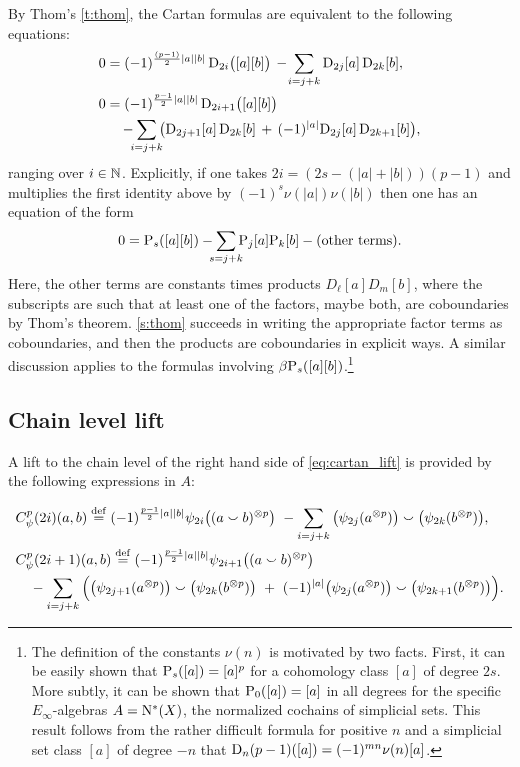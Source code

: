 By Thom's \cref{t:thom}, the Cartan formulas are equivalent to the following equations:
\begin{equation}\label{eq:cartan_lift}
	\begin{split}
		0 &= (-1)^{\frac{(p-1)}{2}\bars{a}\bars{b}} \, \rD_{2i}\big([a][b]\big) \,-\!
		\sum_{i=j+k} \rD_{2j}[a] \, \rD_{2k}[b], \\
		0 &= (-1)^{\frac{p-1}{2}\bars{a}\bars{b}} \, \rD_{2i+1}\big([a][b]\big) \\ & \quad
		-\sum_{\mathclap{i=j+k}} \big(\rD_{2j+1}[a] \, \rD_{2k}[b] \, +\, (-1)^{\bars{a}}\rD_{2j}[a] \, \rD_{2k+1}[b]\big),
	\end{split}
\end{equation}
ranging over $i \in \mathbb{N}$.
Explicitly, if one takes $2i = (2s-(|a|+|b|))(p-1)$ and multiplies the first identity above by $(-1)^s \nu(|a|)\nu(|b|)$ then one has an equation of the form
\[
0 = \rP_s([a][b]) - \sum_{\mathclap{s=j+k}} \rP_j[a] \rP_k[b] - \text{(other terms)}.
\]
Here, the other terms are constants times products $D_\ell[a] D_m[b]$, where the subscripts are such that at least one of the factors, maybe both, are coboundaries by Thom’s theorem.
\cref{s:thom} succeeds in writing the appropriate factor terms as coboundaries, and then the products are coboundaries in explicit ways.
A similar discussion applies to the formulas involving $\beta \mathrm{P}_s([a][b])$.\footnote{\label{fn:mu}
The definition of the constants $\nu(n)$ is motivated by two facts.
First, it can be easily shown that $\mathrm{P}_s([a]) = [a]^p$ for a cohomology class $[a]$ of degree $2s$.
More subtly, it can be shown that $\mathrm{P}_0([a]) = [a]$ in all degrees for the specific $E_\infty$-algebras $A = \operatorname{N^{\ast}}(X)$, the normalized cochains of simplicial sets.
This result follows from the rather difficult formula for positive $n$ and a simplicial set class $[a]$ of degree $-n$ that $\mathrm{D}_n(p-1)([a]) = (-1)^{mn} \nu(n)[a]$.
}

\subsection{Chain level lift}

A lift to the chain level of the right hand side of \cref{eq:cartan_lift} is provided by the following expressions in $A$:

\begin{align*}
	&C_\psi^p(2i)(a,b) \defeq (-1)^{\frac{p-1}{2}\bars{a}\bars{b}} \psi_{2i}\big((a \cp b)^{\ot p}\big) \ -
	\sum_{i=j+k}\big(\psi_{2j}(a^{\ot p})\big) \cp \big(\psi_{2k}(b^{\ot p})\big), \\
	&C_\psi^p(2i+1)(a,b) \defeq (-1)^{\frac{p-1}{2}\bars{a}\bars{b}} \psi_{2i+1}\big((a \cp b)^{\ot p}\big) \\
	&\quad -\sum_{i=j+k} \Big(
	\big(\psi_{2j+1}(a^{\ot p})\big) \cp \big(\psi_{2k}(b^{\ot p})\big)\ +\
	(-1)^{\bars{a}}\big(\psi_{2j}(a^{\ot p})\big) \cp \big(\psi_{2k+1}(b^{\ot p})\big)
	\Big).
\end{align*}

